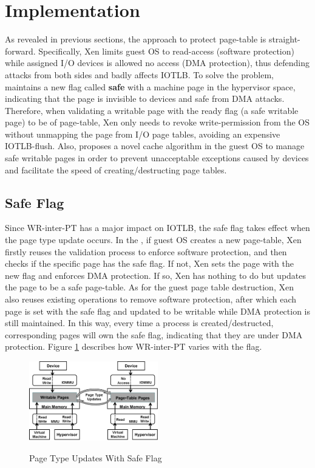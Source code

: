 \section{Implementation} \label{sec:implementation}

As revealed in previous sections, the approach to protect page-table is straight-forward. Specifically, Xen limits guest OS to read-access (software protection) while assigned I/O devices is allowed no access (DMA protection), thus defending attacks from both sides and badly affects IOTLB. To solve the problem, \name maintains a new flag called \textbf{safe} with a machine page in the hypervisor space, indicating that the page is invisible to devices and safe from DMA attacks. Therefore, when validating a writable page with the ready flag (a safe writable page) to be of page-table, Xen only needs to revoke write-permission from the OS without unmapping the page from I/O page tables, avoiding an expensive IOTLB-flush. Also, \name proposes a novel cache algorithm in the guest OS to manage safe writable pages in order to prevent unacceptable exceptions caused by devices and facilitate the speed of creating/destructing page tables.

\subsection{Safe Flag}
Since WR-inter-PT has a major impact on IOTLB, the safe flag takes effect when the page type update occurs. In the \name, if guest OS creates a new page-table, Xen firstly reuses the validation process to enforce software protection, and then checks if the specific page has the safe flag. If not, Xen sets the page with the new flag and enforces DMA protection. If so, Xen has nothing to do but updates the page to be a safe page-table. As for the guest page table destruction, Xen also reuses existing operations to remove software protection, after which each page is set with the safe flag and updated to be writable while DMA protection is still maintained. In this way, every time a process is created/destructed, corresponding pages will own the safe flag, indicating that they are under DMA protection. Figure \ref{fig:safe-flag} describes how WR-inter-PT varies with the flag.

\begin{figure}[ht]
\centering
\includegraphics[width=0.5\textwidth]{image/background/wr2pt.png} \\
\caption{Page Type Updates With Safe Flag}
\label{fig:safe-flag}
\end{figure}

